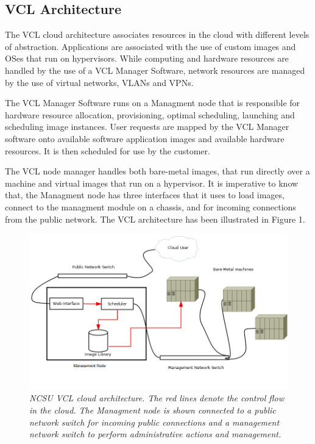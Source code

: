 \documentclass[10pt,twocolumn,pdftex]{article}
\begin{document}
\subsection{VCL Architecture}
The VCL cloud architecture \cite{vcl-arch} associates resources in the cloud with different levels of abstraction. Applications are associated with the use of custom images and OSes that run on hypervisors. While computing and hardware resources are handled by the use of a VCL Manager Software, network resources are managed by the use of virtual networks, VLANs and VPNs.

The VCL Manager Software runs on a Managment node that is responsible for hardware resource allocation, provisioning, optimal scheduling, launching and scheduling image instances. User requests are mapped by the VCL Manager software onto available software application images and available hardware resources. It is then scheduled for use by the customer.

The VCL node manager handles both bare-metal images, that run directly over a machine and virtual images that run on a hypervisor. It is imperative to know that, the Managment node has three interfaces that it uses to load images, connect to the managment module on a chassis, and for incoming connections from the public network. The VCL architecture has been illustrated in Figure 1.\\

\begin{figure}[htp]
\centering
\includegraphics[scale=0.50]{csc574-vcl-architecture.png}
\caption{\small \sl NCSU VCL cloud architecture. The red lines denote the control flow in the cloud. The Managment node is shown connected to a public network switch for incoming public connections and a management network switch to perform administrative actions and management. }
\label{fig:solution}
\end{figure}	
\end{document}
